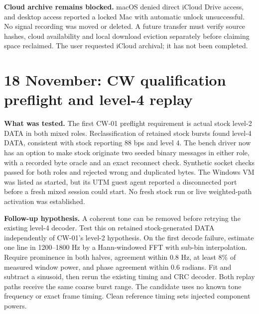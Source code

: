 \documentclass[11pt,a4paper]{article}
\begin{document}
\textbf{Cloud archive remains blocked.} macOS denied direct iCloud Drive access,
and desktop access reported a locked Mac with automatic unlock unsuccessful.
No signal recording was moved or deleted. A future transfer must verify source
hashes, cloud availability and local download eviction separately before claiming
space reclaimed. The user requested iCloud archival; it has not been completed.

\clearpage
\section{18 November: CW qualification preflight and level-4 replay}
\label{sec:cw-level4-preflight}
\textbf{What was tested.} The first CW-01 preflight requirement is actual
stock level-2 DATA in both mixed roles. Reclassification of retained stock
bursts found level-4 DATA, consistent with stock reporting 88 bps and level 4.
The bench driver now has an option to make stock originate two seeded binary
messages in either role, with a recorded byte oracle and an exact reconnect
check. Synthetic socket checks passed for both roles and rejected wrong and
duplicated bytes. The Windows VM was listed as started, but its UTM guest agent
reported a disconnected port before a fresh mixed session could start. No
fresh stock run or live weighted-path activation was established.

\textbf{Follow-up hypothesis.} A coherent tone can be removed before retrying
the existing level-4 decoder. Test this on retained stock-generated DATA
independently of CW-01's level-2 hypothesis. On the first decode failure, estimate
one line in 1200--1800 Hz by a Hann-windowed FFT with sub-bin interpolation.
Require prominence in both halves, agreement within 0.8 Hz, at least 8\% of
measured window power, and phase agreement within 0.6 radians. Fit and subtract
a sinusoid, then rerun the existing timing and CRC decoder. Both replay paths
receive the same coarse burst range. The candidate uses no known tone frequency
or exact frame timing. Clean reference timing sets injected component powers.
\end{document}
